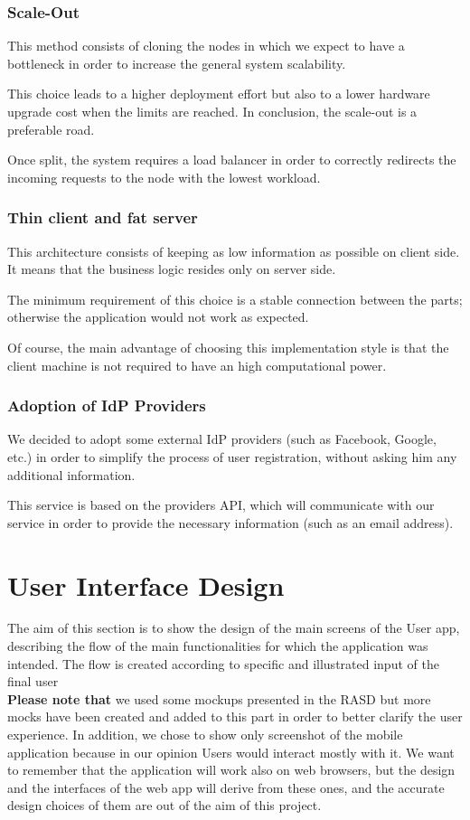 \documentclass[table, 12pt]{article}
\begin{document}
\subsubsection{Scale-Out}
This method consists of cloning the nodes in which we expect to have a bottleneck in order to increase the general system scalability.

This choice leads to a higher deployment effort but also to a lower hardware upgrade cost when the limits are reached. In conclusion, the scale-out is a preferable road.

Once split, the system requires a load balancer in order to correctly redirects the incoming requests to the node with the lowest workload.

\subsubsection{Thin client and fat server}
This architecture consists of keeping as low information as possible on client side. It means that the business logic resides only on server side.

The minimum requirement of this choice is a stable connection between the parts; otherwise the application would not work as expected.

Of course, the main advantage of choosing this implementation style is that the client machine is not required to have an high computational power.

\subsubsection{Adoption of IdP Providers}
We decided to adopt some external IdP providers (such as Facebook, Google, etc.) in order to simplify the process of user registration, without asking him any additional information.

This service is based on the providers API, which will communicate with our service in order to provide the necessary information (such as an email address).

\section{User Interface Design}
The aim of this section is to show the design of the main screens of the User app, describing the flow of the main functionalities for which the application was intended. The flow is created according to specific and illustrated input of the final user \\
\textbf{Please note that} we used some mockups presented in the RASD but more mocks have been created and added to this part in order to better clarify the user experience. In addition, we chose to show only screenshot of the mobile application because in our opinion Users would interact mostly with it. We want to remember that the application will work also on web browsers, but the design and the interfaces of the web app will derive from these ones, and the accurate design choices of them are out of the aim of this project. \\
\end{document}
